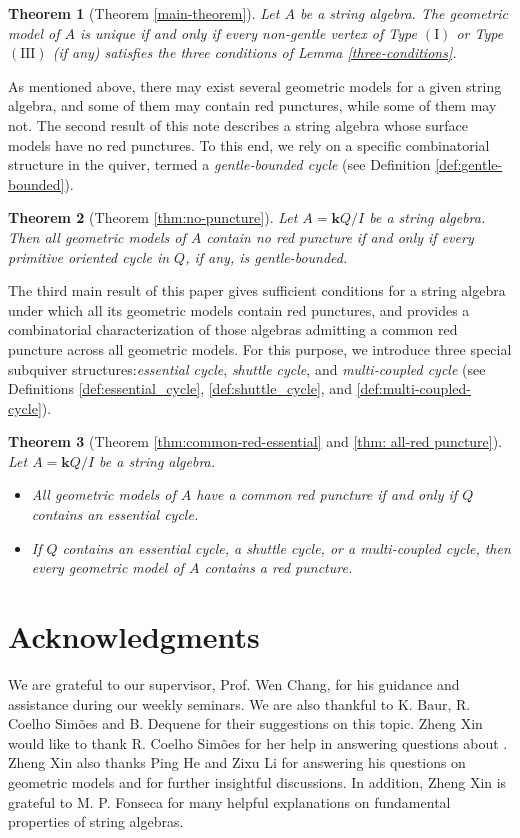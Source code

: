 \documentclass[11pt]{amsart}
\numberwithin{equation}{section}
\newtheorem{theoremA}{Theorem}
\theoremstyle{definition}
\begin{document}
\begin{theoremA}[Theorem \ref{main-theorem}]\label{Mtheorem:object}
    Let $A$ be a string algebra. The geometric model of $A$ is unique if and only if every non-gentle vertex of Type $\mathrm{(I)}$ or Type $\mathrm{(III)}$ (if any) satisfies the three conditions of Lemma \ref{three-conditions}.
  \end{theoremA}
  
As mentioned above, there may exist several geometric models for a given string algebra, and some of them may contain red punctures, while some of them may not. 
The second result of this note describes a string algebra whose surface models have no red punctures. To this end, we rely on a specific combinatorial structure in the quiver, termed a \textit{gentle-bounded cycle} (see Definition \ref{def:gentle-bounded}).

\begin{theoremA}[Theorem \ref{thm:no-puncture}]\label{thm:B}
	Let \(A=\mathbf{k}Q/I\) be a string algebra. Then all geometric models of \(A\) contain no red puncture if and only if every primitive oriented cycle in \(Q\), if any, is
gentle-bounded.
\end{theoremA}
The third main result of this paper gives sufficient conditions for a string algebra under which all its geometric models contain red punctures, and provides a combinatorial characterization of those algebras admitting a common red puncture across all geometric models. For this purpose, we introduce three special subquiver structures:\textit{essential cycle}, \textit{shuttle cycle}, and \textit{multi‑coupled cycle} (see Definitions \ref{def:essential_cycle}, \ref{def:shuttle_cycle}, and \ref{def:multi-coupled-cycle}).

\begin{theoremA}[Theorem \ref{thm:common-red-essential} and \ref{thm: all-red puncture}]\label{thm:C}
Let \(A=\mathbf{k}Q/I\) be a string algebra. 
\begin{itemize}
    \item[(1)] All geometric models of \(A\) have a common red puncture if and only if \(Q\) contains an essential cycle.
    \item[(2)] If \(Q\) contains an
essential cycle, a shuttle cycle, or a multi-coupled cycle, then every geometric model of \(A\) contains a red puncture.
\end{itemize}
\end{theoremA}

\section*{Acknowledgments}
We are grateful to our supervisor, Prof. Wen Chang, for his  guidance and assistance during our weekly seminars. 
We are also thankful to K. Baur, R. Coelho Simões and B. Dequene for their suggestions on this topic. 
Zheng Xin would like to thank R. Coelho Simões for her help in answering questions about \cite[Example 4.13]{BC24}.
Zheng Xin also thanks Ping He and  Zixu Li for answering his questions on geometric models and for further insightful discussions. 
In addition, Zheng Xin is grateful to M. P. Fonseca for many helpful explanations on fundamental properties of string algebras.
\end{document}
